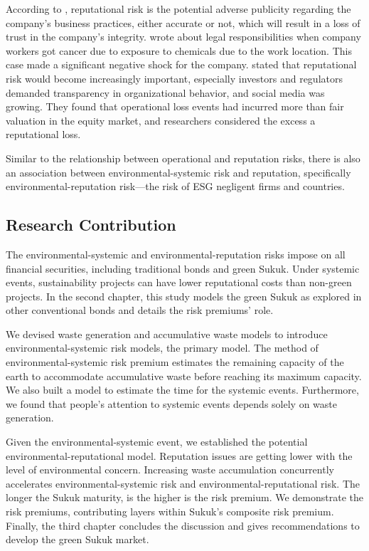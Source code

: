 \documentclass[sn-basic]{sn-jnl}%
\theoremstyle{thmstyleone}%
\theoremstyle{thmstyletwo}%
\theoremstyle{thmstylethree}%
\begin{document}
According to \citet{solvency2007glossary}, reputational risk is the potential adverse publicity regarding the company’s business practices, either accurate or not, which will result in a loss of trust in the company’s integrity. \citet{gormley2011growing} wrote about legal responsibilities when company workers got cancer due to exposure to chemicals due to the work location. This case made a significant negative shock for the company. \citet{gatzert2016assessing} stated that reputational risk would become increasingly important, especially investors and regulators demanded transparency in organizational behavior, and social media was growing. They found that operational loss events had incurred more than fair valuation in the equity market, and researchers considered the excess a reputational loss.

Similar to the relationship between operational and reputation risks, there is also an association between environmental-systemic risk and reputation, specifically environmental-reputation risk—the risk of ESG negligent firms and countries.

\subsection{Research Contribution}

The environmental-systemic and environmental-reputation risks impose on all financial securities, including traditional bonds and green Sukuk. Under systemic events, sustainability projects can have lower reputational costs than non-green projects. In the second chapter, this study models the green Sukuk as explored in other conventional bonds and details the risk premiums' role.

We devised waste generation and accumulative waste models to introduce environmental-systemic risk models, the primary model. The method of environmental-systemic risk premium estimates the remaining capacity of the earth to accommodate accumulative waste before reaching its maximum capacity. We also built a model to estimate the time for the systemic events. Furthermore, we found that people's attention to systemic events depends solely on waste generation.

Given the environmental-systemic event, we established the potential environmental-reputational model. Reputation issues are getting lower with the level of environmental concern. Increasing waste accumulation concurrently accelerates environmental-systemic risk and environmental-reputational risk. The longer the Sukuk maturity, is the higher is the risk premium. We demonstrate the risk premiums, contributing layers within Sukuk’s composite risk premium. Finally, the third chapter concludes the discussion and gives recommendations to develop the green Sukuk market.
\end{document}
